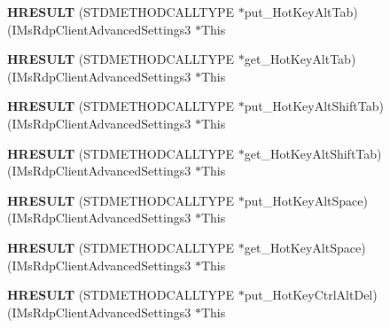 \begin{DoxyCompactItemize}
{\bfseries H\+R\+E\+S\+U\+LT} (S\+T\+D\+M\+E\+T\+H\+O\+D\+C\+A\+L\+L\+T\+Y\+PE $\ast$put\+\_\+\+Hot\+Key\+Alt\+Tab)(I\+Ms\+Rdp\+Client\+Advanced\+Settings3 $\ast$This
\item 
\mbox{\label{struct_i_ms_rdp_client_advanced_settings3_vtbl_a85fcfd1949f7ae652529ddcc2b773532}} 
{\bfseries H\+R\+E\+S\+U\+LT} (S\+T\+D\+M\+E\+T\+H\+O\+D\+C\+A\+L\+L\+T\+Y\+PE $\ast$get\+\_\+\+Hot\+Key\+Alt\+Tab)(I\+Ms\+Rdp\+Client\+Advanced\+Settings3 $\ast$This
\item 
\mbox{\label{struct_i_ms_rdp_client_advanced_settings3_vtbl_a27d95ab771aadda4d02402f15ed3c354}} 
{\bfseries H\+R\+E\+S\+U\+LT} (S\+T\+D\+M\+E\+T\+H\+O\+D\+C\+A\+L\+L\+T\+Y\+PE $\ast$put\+\_\+\+Hot\+Key\+Alt\+Shift\+Tab)(I\+Ms\+Rdp\+Client\+Advanced\+Settings3 $\ast$This
\item 
\mbox{\label{struct_i_ms_rdp_client_advanced_settings3_vtbl_ab40937f33cd818b1dcabbdf06cd8e351}} 
{\bfseries H\+R\+E\+S\+U\+LT} (S\+T\+D\+M\+E\+T\+H\+O\+D\+C\+A\+L\+L\+T\+Y\+PE $\ast$get\+\_\+\+Hot\+Key\+Alt\+Shift\+Tab)(I\+Ms\+Rdp\+Client\+Advanced\+Settings3 $\ast$This
\item 
\mbox{\label{struct_i_ms_rdp_client_advanced_settings3_vtbl_ae22b3f6609bb89089d7688aed3a8072a}} 
{\bfseries H\+R\+E\+S\+U\+LT} (S\+T\+D\+M\+E\+T\+H\+O\+D\+C\+A\+L\+L\+T\+Y\+PE $\ast$put\+\_\+\+Hot\+Key\+Alt\+Space)(I\+Ms\+Rdp\+Client\+Advanced\+Settings3 $\ast$This
\item 
\mbox{\label{struct_i_ms_rdp_client_advanced_settings3_vtbl_aca5737784271b7b9d727f5917750f418}} 
{\bfseries H\+R\+E\+S\+U\+LT} (S\+T\+D\+M\+E\+T\+H\+O\+D\+C\+A\+L\+L\+T\+Y\+PE $\ast$get\+\_\+\+Hot\+Key\+Alt\+Space)(I\+Ms\+Rdp\+Client\+Advanced\+Settings3 $\ast$This
\item 
\mbox{\label{struct_i_ms_rdp_client_advanced_settings3_vtbl_a06cd998e5e380fc3dc2f85c09c84dbb3}} 
{\bfseries H\+R\+E\+S\+U\+LT} (S\+T\+D\+M\+E\+T\+H\+O\+D\+C\+A\+L\+L\+T\+Y\+PE $\ast$put\+\_\+\+Hot\+Key\+Ctrl\+Alt\+Del)(I\+Ms\+Rdp\+Client\+Advanced\+Settings3 $\ast$This

\end{DoxyCompactItemize}
